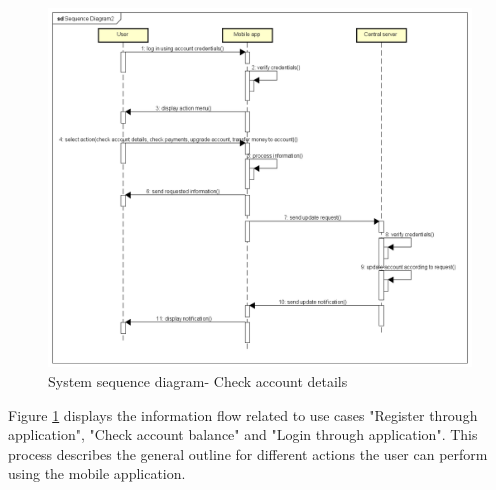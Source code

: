 \begin{figure}[H]
	\centering
	\includegraphics[width=\textwidth]{Pictures/seq_diagram_checkAccount.png}
	\caption{System sequence diagram- Check account details}
	\label{fig:seqDiagram3}
\end{figure}
Figure \ref{fig:seqDiagram3} displays the information flow related to use cases "Register through application", "Check account balance" and "Login through application". This process describes the general outline for different actions the user can perform using the mobile application.


